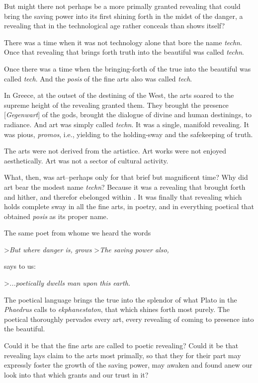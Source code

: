 But might there not perhaps be a more primally granted revealing that could bring the saving power into its first shining forth in the midst of the danger, a revealing that in the technological age rather conceals than shows itself?

There was a time when it was not technology alone that bore the name \textit{techn}. Once that revealing that brings forth truth into the beautiful was called \textit{techn}.

Once there was a time when the bringing-forth of the true into the beautiful was called \textit{tech}. And the \textit{posis} of the fine arts also was called \textit{tech}.

In Greece, at the outset of the destining of the West, the arts soared to the supreme height of the revealing granted them. They brought the presence [\textit{Gegenwart}] of the gods, brought the dialogue of divine and human destinings, to radiance. And art was simply called \textit{techn}. It was a single, manifold revealing. It was pious, \textit{promos}, i.e., yielding to the holding-sway and the safekeeping of truth.

The arts were not derived from the artistice. Art works were not enjoyed aesthetically. Art was not a sector of cultural activity.

What, then, was art--perhaps only for that brief but magnificent time? Why did art bear the modest name \textit{techn}? Because it was a revealing that brought forth and hither, and therefor ebelonged within . It was finally that revealing which holds complete sway in all the fine arts, in poetry, and in everything poetical that obtained \textit{posis} as its proper name.

The same poet from whome we heard the words

>\textit{But where danger is, grows}
>\textit{The saving power also,}

says to us:

>\textit{...poetically dwells man upon this earth.}

The poetical language brings the true into the splendor of what Plato in the \textit{Phaedrus} calls to \textit{ekphanestaton}, that which shines forth most purely. The poetical thoroughly pervades every art, every revealing of coming to presence into the beautiful.

Could it be that the fine arts are called to poetic revealing? Could it be that revealing lays claim to the arts most primally, so that they for their part may expressly foster the growth of the saving power, may awaken and found anew our look into that which grants and our trust in it?

